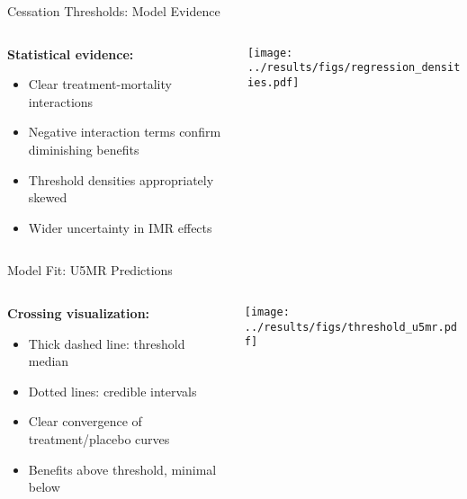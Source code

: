 \documentclass[aspectratio=169]{beamer}\usepackage[]{graphicx}\usepackage[dvipsnames]{xcolor}
\begin{document}
\begin{frame}{Cessation Thresholds: Model Evidence}
\begin{columns}
\begin{column}{0.35\textwidth}
\textbf{Statistical evidence:}
\begin{itemize}
  \item Clear treatment-mortality interactions
  \item Negative interaction terms confirm diminishing benefits
  \item Threshold densities appropriately skewed
  \item Wider uncertainty in IMR effects
\end{itemize}
\end{column}
\begin{column}{0.6\textwidth}
\begin{center}
\texttt{[image: ../results/figs/regression\_densities.pdf]}
\end{center}
\end{column}
\end{columns}
\end{frame}

\begin{frame}{Model Fit: U5MR Predictions}
\begin{columns}
\begin{column}{0.35\textwidth}
\textbf{Crossing visualization:}
\begin{itemize}
  \item Thick dashed line: threshold median
  \item Dotted lines: credible intervals
  \item Clear convergence of treatment/placebo curves
  \item Benefits above threshold, minimal below
\end{itemize}
\end{column}
\begin{column}{0.65\textwidth}
\begin{center}
\texttt{[image: ../results/figs/threshold\_u5mr.pdf]}
\end{center}
\end{column}
\end{columns}
\end{frame}
\end{document}
